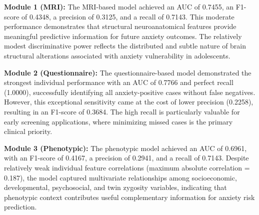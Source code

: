 \documentclass[10pt,letterpaper]{article}
\begin{document}
                                                                                                                          \textbf{Module 1 (MRI):} The MRI-based model achieved an AUC of 0.7455, an F1-score of 0.4348, a precision of 0.3125, and a recall of 0.7143. This moderate performance demonstrates that structural neuroanatomical features provide meaningful predictive information for future anxiety outcomes. The relatively modest discriminative power reflects the distributed and subtle nature of brain structural alterations associated with anxiety vulnerability in adolescents.

                                                                                                                          \textbf{Module 2 (Questionnaire):} The questionnaire-based model demonstrated the strongest individual performance with an AUC of 0.7766 and perfect recall (1.0000), successfully identifying all anxiety-positive cases without false negatives. However, this exceptional sensitivity came at the cost of lower precision (0.2258), resulting in an F1-score of 0.3684. The high recall is particularly valuable for early screening applications, where minimizing missed cases is the primary clinical priority.

                                                                                                                          \textbf{Module 3 (Phenotypic):} The phenotypic model achieved an AUC of 0.6961, with an F1-score of 0.4167, a precision of 0.2941, and a recall of 0.7143. Despite relatively weak individual feature correlations (maximum absolute correlation = 0.187), the model captured multivariate relationships among socioeconomic, developmental, psychosocial, and twin zygosity variables, indicating that phenotypic context contributes useful complementary information for anxiety risk prediction.
\end{document}
